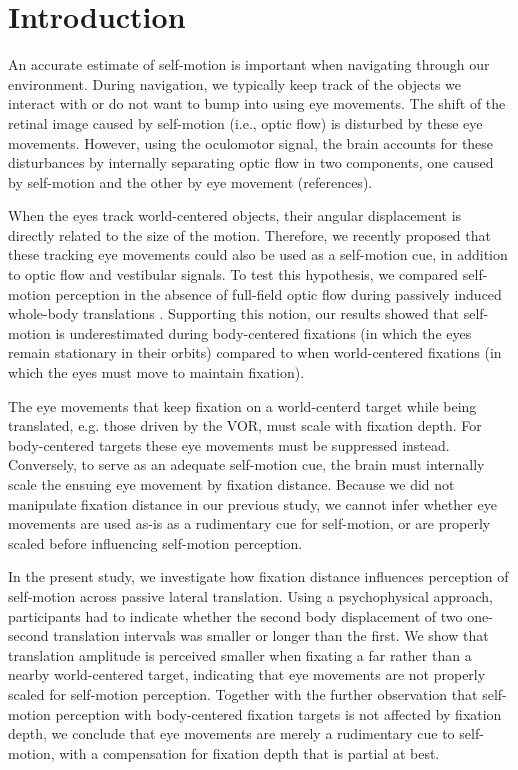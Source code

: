 \section{Introduction}

An accurate estimate of self-motion is important when navigating through our environment. During navigation, we typically keep track of the objects we interact with or do not want to bump into using eye movements. The shift of the retinal image caused by self-motion (i.e., optic flow) is disturbed by these eye movements. However, using the oculomotor signal, the brain accounts for these disturbances by internally separating optic flow in two components, one caused by self-motion and the other by eye movement (references).

When the eyes track world-centered objects, their angular displacement is directly related to the size of the motion. Therefore, we recently proposed that these tracking eye movements could also be used as a self-motion cue, in addition to optic flow and vestibular signals. To test this hypothesis, we compared self-motion perception in the absence of full-field optic flow during passively induced whole-body translations \cite{clemens2015a}. Supporting this notion, our results showed that self-motion is underestimated during body-centered fixations (in which the eyes remain stationary in their orbits) compared to when world-centered fixations (in which the eyes must move to maintain fixation).

The eye movements that keep fixation on a world-centerd target while being translated, e.g. those driven by the VOR, must scale with fixation depth. For body-centered targets these eye movements must be suppressed instead. Conversely, to serve as an adequate self-motion cue, the brain must internally scale the ensuing eye movement by fixation distance. Because we did not manipulate fixation distance in our previous study, we cannot infer whether eye movements are used as-is as a rudimentary cue for self-motion, or are properly scaled before influencing self-motion perception.

In the present study, we investigate how fixation distance influences perception of self-motion across passive lateral translation. Using a psychophysical approach, participants had to indicate whether the second body displacement of two one-second translation intervals was smaller or longer than the first. We show that translation amplitude is perceived smaller when fixating a far rather than a nearby world-centered target, indicating that eye movements are not properly scaled for self-motion perception. Together with the further observation that self-motion perception with body-centered fixation targets is not affected by fixation depth, we conclude that eye movements are merely a rudimentary cue to self-motion, with a compensation for fixation depth that is partial at best.